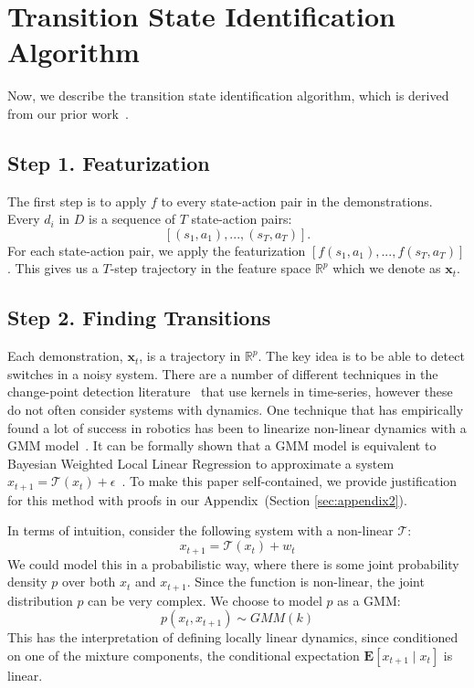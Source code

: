 %

\section{Transition State Identification Algorithm}\label{sec:algo}
Now, we describe the transition state identification algorithm, which is derived from our prior work~\cite{krishnan2015tsc,murali2016}.

\subsection*{Step 1. Featurization}
The first step is to apply $f$ to every state-action pair in the demonstrations.
Every $d_i$ in $D$ is a sequence of $T$ state-action pairs:
\[
[(s_1,a_1),...,(s_T,a_T)].
\]
For each state-action pair, we apply the featurization $[ f(s_1,a_1),...,f(s_T,a_T)]$.
This gives us a $T$-step trajectory in the feature space $\mathbb{R}^p$ which we denote as $\mathbf{x}_t$.

\subsection*{Step 2. Finding Transitions}
Each demonstration, $\mathbf{x}_t$, is a trajectory in $\mathbb{R}^p$.
The key idea is to be able to detect switches in a noisy system.
There are a number of different techniques in the change-point detection literature~\cite{harchaoui2009kernel} that use kernels in time-series, however these do not often consider systems with dynamics.
One technique that has empirically found a lot of success in robotics has been to linearize non-linear dynamics with a GMM model~\cite{moldovan2013dirichlet,calinon2014task, khansari2011learning}.
It can be formally shown that a GMM model is equivalent to Bayesian Weighted Local Linear Regression to approximate a system $x_{t+1} = \mathcal{T}(x_{t}) + \epsilon$~\cite{moldovan2013dirichlet}.
To make this paper self-contained, we provide justification for this method with proofs in our Appendix~(Section \ref{sec:appendix2}).

In terms of intuition, consider the following system with a non-linear $\mathcal{T}$:
\[
x_{t+1} = \mathcal{T}(x_{t}) + w_{t}
\]
We could model this in a probabilistic way, where there is some joint probability density $p$ over both $x_{t}$ and $x_{t+1}$. 
Since the function is non-linear, the joint distribution $p$ can be very complex.
We choose to model $p$ as a GMM:
\[
p(x_{t},x_{t+1}) \sim GMM(k)
\]
This has the interpretation of defining locally linear dynamics, since conditioned on one of the mixture components, the conditional expectation $\mathbf{E}[x_{t+1} \mid  x_{t}]$ is linear.

